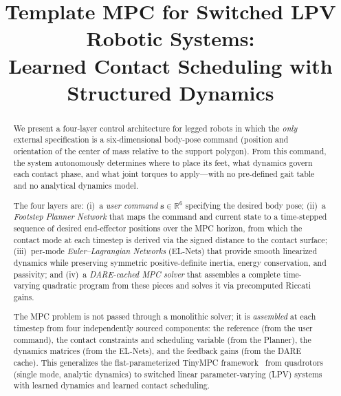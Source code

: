 \documentclass[letterpaper, 10pt, conference]{IEEEtran}
\newcommand{\R}{\mathbb{R}}
\begin{document}
\title{Template MPC for Switched LPV Robotic Systems:\\
  Learned Contact Scheduling with Structured Dynamics}

\author{
}

\maketitle

\begin{abstract}
We present a four-layer control architecture for legged robots
in which the \emph{only} external specification is a six-dimensional
body-pose command (position and orientation of the center of mass
relative to the support polygon).
From this command, the system autonomously determines
where to place its feet, what dynamics govern each contact phase,
and what joint torques to apply---with no pre-defined gait table
and no analytical dynamics model.

The four layers are:
(i)~a \emph{user command} $\bm{s} \in \R^6$
  specifying the desired body pose;
(ii)~a \emph{Footstep Planner Network} that maps the command
  and current state to a time-stepped sequence of desired
  end-effector positions over the MPC horizon, from which
  the contact mode at each timestep is derived via the
  signed distance to the contact surface;
(iii)~per-mode \emph{Euler--Lagrangian Networks} (EL-Nets) that
  provide smooth linearized dynamics while preserving
  symmetric positive-definite inertia, energy conservation,
  and passivity;
and (iv)~a \emph{DARE-cached MPC solver} that assembles a
  complete time-varying quadratic program from these pieces
  and solves it via precomputed Riccati gains.

The MPC problem is not passed through a monolithic solver;
it is \emph{assembled} at each timestep from four independently
sourced components: the reference (from the user command),
the contact constraints and scheduling variable (from the Planner),
the dynamics matrices (from the EL-Nets), and the feedback
gains (from the DARE cache).
This generalizes the flat-parameterized TinyMPC
framework~\cite{zhang2025flat} from quadrotors
(single mode, analytic dynamics) to switched linear
parameter-varying (LPV) systems with learned dynamics
and learned contact scheduling.
\end{abstract}
\end{document}
